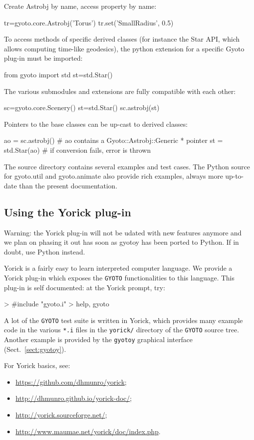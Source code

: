 \documentclass[a4paper,12pt]{article}
\begin{document}
Create Astrobj by name, access property by name:
\begin{code}
  tr=gyoto.core.Astrobj('Torus')
  tr.set('SmallRadius', 0.5)
\end{code}

To access methods of specific derived classes (for instance the Star
API, which allows computing time-like geodesics), the python extension
for a specific Gyoto plug-in must be imported:
\begin{code}
  from gyoto import std
  st=std.Star()
\end{code}
The various submodules and extensions are fully compatible with each
other:
\begin{code}
  sc=gyoto.core.Scenery()
  st=std.Star()
  sc.astrobj(st)
\end{code}
Pointers to the base classes can be up-cast to derived classes:
\begin{code}
  ao = sc.astrobj() # ao contains a Gyoto::Astrobj::Generic * pointer
  st = std.Star(ao) # if conversion fails, error is thrown
\end{code}

The source directory contains several examples and test cases. The
Python source for gyoto.util and gyoto.animate also provide rich
examples, always more up-to-date than the present documentation.

\subsection{Using the Yorick plug-in}
\label{sect:yorick}
Warning: the Yorick plug-in will not be udated with new features
anymore and we plan on phasing it out has soon as gyotoy has been
ported to Python. If in doubt, use Python instead.

Yorick is a fairly easy to learn interpreted computer language. We
provide a Yorick plug-in which exposes the \texttt{GYOTO}
functionalities to this language. This plug-in is self documented: at
the Yorick prompt, try:
\begin{code}
 > #include "gyoto.i"
 > help, gyoto
\end{code}

A lot of the \texttt{GYOTO} test suite is written in Yorick, which
provides many example code in the various \texttt{*.i} files in the
\texttt{yorick/} directory of the \texttt{GYOTO} source tree. Another
example is provided by the \texttt{gyotoy} graphical interface
(Sect.~\ref{sect:gyotoy}).

For Yorick basics, see:
\begin{itemize}
\item \url{https://github.com/dhmunro/yorick};
\item \url{http://dhmunro.github.io/yorick-doc/};
\item \url{http://yorick.sourceforge.net/};
\item \url{http://www.maumae.net/yorick/doc/index.php}.
\end{itemize}
\end{document}
